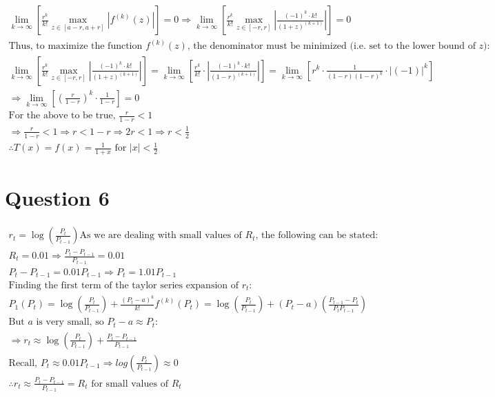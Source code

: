 \documentclass[letterpaper,10pt]{article}
\begin{document}
\begin{gather*}
			\lim_{k \rightarrow \infty} \left[ \frac{r^k}{k!} \max_{z \in [a-r,a+r]} \left|f^{(k)}(z)\right| \right] = 0
			\Rightarrow \lim_{k \rightarrow \infty} \left[ \frac{r^k}{k!} \max_{z \in [-r,r]} \left|\frac{(-1)^{k} \cdot k!}{(1+z)^{(k+1)}}\right| \right] = 0 \\
			\text{Thus, to maximize the function $f^(k)(z)$, the denominator must be minimized (i.e. set to the lower bound of $z$):} \\
			\lim_{k \rightarrow \infty} \left[ \frac{r^k}{k!} \max_{z \in [-r,r]} \left|\frac{(-1)^{k} \cdot k!}{(1+z)^{(k+1)}}\right| \right] = \lim_{k \rightarrow \infty} \left[ \frac{r^k}{k!} \cdot \left|\frac{(-1)^{k} \cdot k!}{(1-r)^{(k+1)}}\right| \right] = \lim_{k \rightarrow \infty} \left[ r^k \cdot \frac{1}{(1-r)(1-r)^k} \cdot |(-1)|^k \right] \\
			\Rightarrow \lim_{k \rightarrow \infty} \left[ \left( \frac{r}{1-r} \right)^k \cdot \frac{1}{1-r} \right] = 0 \\
			\text{For the above to be true, $\frac{r}{1-r} < 1$} \\
			\Rightarrow \frac{r}{1-r} < 1 \Rightarrow r < 1-r \Rightarrow 2r < 1 \Rightarrow r < \frac{1}{2} \\
			\therefore T(x) = f(x) = \frac{1}{1+x} \text{ for } |x| < \frac{1}{2}
		\end{gather*}


	\section{Question 6}
		\begin{gather*}
			r_t = \log \left( \frac{P_t}{P_{t-1}} \right)
			\text{As we are dealing with small values of $R_t$, the following can be stated:} \\
			R_t = 0.01 \Rightarrow \frac{P_t-P_{t-1}}{P_{t-1}} = 0.01 \\
			P_t - P_{t-1} = 0.01 P_{t-1} \Rightarrow P_t = 1.01P_{t-1} \\
			\text{Finding the first term of the taylor series expansion of $r_t$:} \\
			P_1(P_t) = \log \left( \frac{P_t}{P_{t-1}} \right) + \frac{(P_t-a)^k}{k!}f^{(k)}(P_t) = \log \left( \frac{P_t}{P_{t-1}} \right) + (P_t-a)\left( \frac{P_{t-1}-P_t}{P_tP_{t-1}} \right) \\
			\text{But $a$ is very small, so $P_t-a \approx P_t$:} \\
			\Rightarrow r_t \approx \log \left( \frac{P_t}{P_{t-1}} \right) + \frac{P_t - P_{t-1}}{P_{t-1}} \\
			\text{Recall, $P_t \approx 0.01P_{t-1} \Rightarrow log \left( \frac{P_t}{P_{t-1}} \right) \approx 0$} \\
			\therefore r_t \approx \frac{P_t-P_{t-1}}{P_{t-1}} = R_t \text{ for small values of $R_t$}
		\end{gather*}
\end{document}

